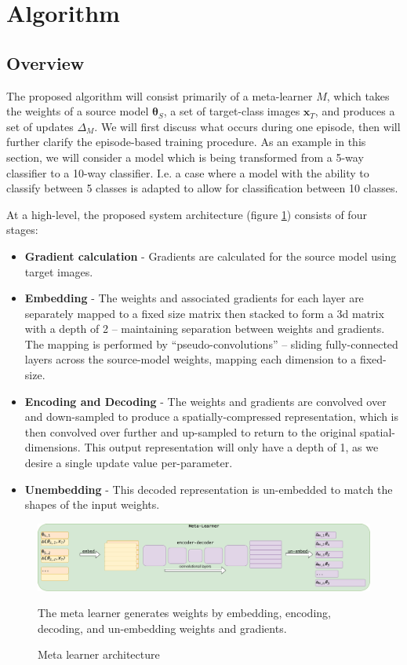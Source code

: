 \documentclass{report}
\begin{document}
	\section{Algorithm}
	\subsection{Overview}
	
	The proposed algorithm will consist primarily of a meta-learner $M$, which takes the weights of a source model $\bm{\theta}_S$, a set of target-class images $\bm{x}_T$, and produces a set of updates $\Delta_M$. We will first discuss what occurs during one episode, then will further clarify the episode-based training procedure. As an example in this section, we will consider a model which is being transformed from a 5-way classifier to a 10-way classifier. I.e. a case where a model with the ability to classify between 5 classes is adapted to allow for classification between 10 classes. \par
	At a high-level, the proposed system architecture (figure \ref{fig:ml:1}) consists of four stages: 
	\begin{itemize}
		\item \textbf{Gradient calculation} - Gradients are calculated for the source model using target images.
		\item \textbf{Embedding} - The weights and associated gradients for each layer are separately mapped to a fixed size matrix then stacked to form a 3d matrix with a depth of 2 -- maintaining separation between weights and gradients. The mapping is performed by ``pseudo-convolutions'' -- sliding fully-connected layers across the source-model weights, mapping each dimension to a fixed-size.
		\item \textbf{Encoding and Decoding} - The weights and gradients are convolved over and down-sampled to produce a spatially-compressed representation, which is then convolved over further and up-sampled to return to the original spatial-dimensions. This output representation will only have a depth of 1, as we desire a single update value per-parameter.
		\item \textbf{Unembedding} - This decoded representation is un-embedded to match the shapes of the input weights.
	\end{itemize}
	\begin{figure}[h]
		\centering
		\includegraphics[width=17cm]{metalearnerarchitecture}
		\caption{Meta learner architecture}
		The meta learner generates weights by embedding, encoding, decoding, and un-embedding weights and gradients.
		\label{fig:ml:1}
	\end{figure}
\end{document}
